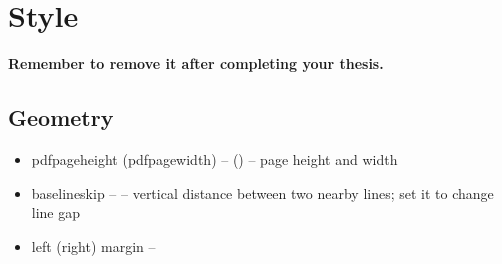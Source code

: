 \chapter{Style}
\textbf{Remember to remove it after completing your thesis.}

\section{Geometry}
\begin{itemize}
    \item pdfpageheight (pdfpagewidth) -- \the\pdfpagewidth (\the\pdfpageheight) -- page height and width
    \item baselineskip -- \the\baselineskip -- vertical distance between two
	nearby lines; set it to change line gap
    \item left (right) margin -- 

\end{itemize}
